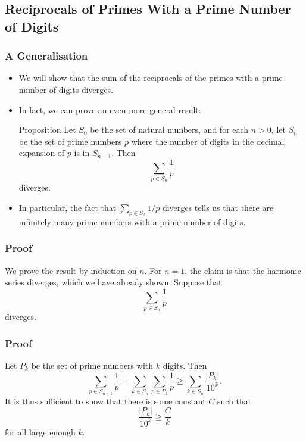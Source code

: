 \documentclass{beamer}
\begin{document}
\subsection{Reciprocals of Primes With a Prime Number of Digits}

\begin{frame}
    \frametitle{A Generalisation}

    \begin{itemize}
        \item We will show that the sum of the reciprocals of the primes with a prime number of digits diverges. \pause
        \item In fact, we can prove an even more general result:
        \begin{block}{Proposition}
            Let $S_0$ be the set of natural numbers, and for each $n > 0$, let $S_n$ be the set of prime numbers $p$ where the number of digits in the decimal expansion of $p$ is in $S_{n - 1}$. Then
            \[
                \sum_{p \in S_n} \frac{1}{p}    
            \]
            diverges.
        \end{block}
        \pause
        \item In particular, the fact that $\sum_{p \in S_2} 1\slash p$ diverges tells us that there are infinitely many prime numbers with a prime number of digits.
    \end{itemize} 

\end{frame}

\begin{frame}
    \frametitle{Proof}

    We prove the result by induction on $n$. \pause
    For $n = 1$, the claim is that the harmonic series diverges, which we have already shown. \pause
    Suppose that
    \[
       \sum_{p \in S_n} \frac{1}{p}
    \]
    diverges.

\end{frame}

\begin{frame}
    \frametitle{Proof}

    Let $P_k$ be the set of prime numbers with $k$ digits. Then
    \[
       \sum_{p \in S_{n + 1}} \frac{1}{p} = \sum_{k \in S_n} \sum_{p \in P_k} \frac{1}{p} \geq \sum_{k \in S_n} \frac{\left| P_k \right|}{10^{k}}.
    \]
    \pause
    It is thus sufficient to show that there is some constant $C$ such that
    \[
       \frac{\left| P_k \right|}{10^{k}} \geq \frac{C}{k}    
    \]
    for all large enough $k$.

\end{frame}
\end{document}
